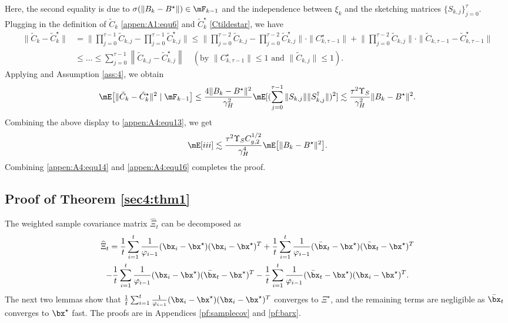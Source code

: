 Here, the second equality is due to $\sigma(\|B_k-B^\star\|)\in\mF_{k-1}$ and the independence between $\xi_k$ and the sketching matrices $\{S_{k,j}\}_{j=0}^\tau$. Plugging in the definition of $\tilde{C}_k$ \eqref{appen:A1:equ6} and $\tilde{C}_k^\star$ \eqref{Ctildestar}, we have
\begin{align*}
\|\tilde{C}_k-\tilde{C}_k^\star\| &=\Big\|\prod_{j=0}^{\tau-1} \tilde{C}_{k, j}-\prod_{j=0}^{\tau-1} \tilde{C}_{k, j}^\star\Big\|
\leq \Big\|\prod_{j=0}^{\tau-2} \tilde{C}_{k, j}-\prod_{j=0}^{\tau-2} \tilde{C}_{k, j}^\star\Big\|\cdot \|C_{k, \tau-1}^\star\|
+\Big\|\prod_{j=0}^{\tau-2} \tilde{C}_{k, j}\Big\|\cdot \|\tilde{C}_{k, \tau-1}-\tilde{C}_{k, \tau-1}^\star\|\\
&\leq\dots\leq \sum_{j=0}^{\tau-1}\left\|\tilde{C}_{k, j}-\tilde{C}_{k, j}^\star\right\|\quad(\text{by }\|C_{k, \tau-1}^\star\|\leq 1\text{ and }\|\tilde{C}_{k,j}\|\leq 1).
\end{align*}
Applying \cite[Lemma 5.2]{Na2022Statistical} and Assumption \ref{ass:4}, we obtain
\begin{equation*}
\mE\big[\|\tilde{C}_k-\tilde{C}_k^\star\|^2\mid\mF_{k-1}\big]\leq
\frac{4\|B_k-B^\star\|^2}{\gamma_H^2}\mE[(\sum_{j=0}^{\tau-1}\|S_{k, j}\|\|S_{k,j}^\dagger\|)^2]\lesssim \frac{\tau^2\Upsilon_{S}}{\gamma_H^2}\|B_k-B^\star\|^2.
\end{equation*}
Combining the above display to \eqref{appen:A4:equ13}, we get
\begin{equation}\label{appen:A4:equ16}
\mE[\uppercase\expandafter{\romannumeral3}]\lesssim \frac{\tau^2\Upsilon_{S}C_{g,2}^{1/2}}{\gamma_H^4}\mE\big[\|B_k-B^\star\|^2\big].
\end{equation}
Combining \eqref{appen:A4:equ14} and \eqref{appen:A4:equ16} completes the proof.


\subsection{Proof of Theorem \ref{sec4:thm1}}\label{appen:A5}

The weighted sample covariance matrix $\hat{\Xi}_t$ can be decomposed as
\begin{multline}\label{appen:A5:equ1}
\widehat{\Xi}_t = \frac{1}{t}\sum_{i=1}^t\frac{1}{\varphi_{i-1}}(\bx_i-\bx^\star)(\bx_i-\bx^\star)^T + \frac{1}{t}\sum_{i=1}^t\frac{1}{\varphi_{i-1}}(\bar{\bx}_t-\bx^\star)(\bar{\bx}_t-\bx^\star)^T \\
- \frac{1}{t}\sum_{i=1}^t\frac{1}{\varphi_{i-1}}(\bx_i-\bx^\star)(\bar{\bx}_t-\bx^\star)^T - \frac{1}{t}\sum_{i=1}^t\frac{1}{\varphi_{i-1}}(\bar{\bx}_t-\bx^\star)(\bx_i-\bx^\star)^T.
\end{multline}
The next two lemmas show that $\frac{1}{t}\sum_{i=1}^t\frac{1}{\varphi_{i-1}}(\bx_i-\bx^\star)(\bx_i-\bx^\star)^T$ converges to $\Xi^{\star}$, and the remaining terms are negligible as $\bar{\bx}_t$ converges to $\bx^\star$ fast. The proofs are in Appendices \ref{pf:samplecov} and \ref{pf:barx}.



